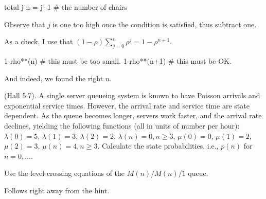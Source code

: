\begin{exercise}
\begin{solution}
\begin{pyconsole}
total
j
n = j- 1 # the number of chairs 
\end{pyconsole} 

Observe that $j$ is one too high once the condition is satisfied, thus subtract one.

As a check, I use that $(1-\rho) \sum_{j=0}^n \rho^j = 1-\rho^{n+1}$.

\begin{pyconsole}
1-rho**(n) #  this must be too small.
1-rho**(n+1) # this must be OK.
\end{pyconsole} 

And indeed, we found the right $n$.

    \end{solution}
\end{exercise}

\begin{exercise}
  (Hall 5.7). A single server queueing system is known to have Poisson
  arrivals and exponential service times. However, the arrival rate
  and service time are state dependent. As the queue becomes longer,
  servers work faster, and the arrival rate declines, yielding the
  following functions (all in units of number per hour):
  $\lambda(0) = 5$, $\lambda(1)=3$, $\lambda(2)=2$,
  $\lambda(n)=0, n\geq 3$, $\mu(0) = 0$, $\mu(1)=2$, $\mu(2)=3$, $\mu(n)=4, n\geq 3$. 
Calculate the state probabilities, i.e., $p(n)$ for $n=0,\ldots$. 
\begin{hint}
Use the level-crossing equations of the $M(n)/M(n)/1$ queue.
\end{hint}
    \begin{solution}
      Follows right away from the hint.
    \end{solution}
\end{exercise}

